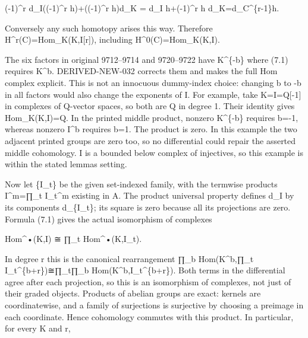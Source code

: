 \documentclass[11pt]{article}
\begin{document}
(-1)\allowbreak{}\textasciicircum{}r d\_\allowbreak{}I((-1)\allowbreak{}\textasciicircum{}r h)\allowbreak{}\allowbreak{}+((-1)\allowbreak{}\textasciicircum{}r h)\allowbreak{}d\_\allowbreak{}K \allowbreak{}= d\_\allowbreak{}I h\allowbreak{}+(-1)\allowbreak{}\textasciicircum{}r h d\_\allowbreak{}K\allowbreak{}=d\_\allowbreak{}C\textasciicircum{}\{r-1\}h.

Conversely any such homotopy arises this way. Therefore H\textasciicircum{}r(C)\allowbreak{}\allowbreak{}=Hom\_\allowbreak{}K(K,\allowbreak{}I[r]\allowbreak{})\allowbreak{},\allowbreak{} including H\textasciicircum{}0(C)\allowbreak{}\allowbreak{}=Hom\_\allowbreak{}K(K,\allowbreak{}I)\allowbreak{}.

The six factors in original 9712–\allowbreak{}9714 and 9720–\allowbreak{}9722 have K\^{}\{-b\} where (7.1)\allowbreak{} requires K\^{}b. DERIVED-NEW-032 corrects them and makes the full Hom complex explicit. This is not an innocuous dummy-index choice:\allowbreak{} changing b to -b in all factors would also change the exponents of I. For example,\allowbreak{} take K\allowbreak{}=I\allowbreak{}=Q[-1]\allowbreak{} in complexes of Q-vector spaces,\allowbreak{} so both are Q in degree 1. Their identity gives Hom\_\allowbreak{}K(K,\allowbreak{}I)\allowbreak{}\allowbreak{}=Q. In the printed middle product,\allowbreak{} nonzero K\^{}\{-b\} requires b\allowbreak{}=-1,\allowbreak{} whereas nonzero I\^{}b requires b\allowbreak{}=1. The product is zero. In this example the two adjacent printed groups are zero too,\allowbreak{} so no differential could repair the asserted middle cohomology. I is a bounded below complex of injectives,\allowbreak{} so this example is within the stated lemma\textquotesingle s setting.

Now let \{I\_\allowbreak{}t\} be the given set-indexed family,\allowbreak{} with the termwise products I\textasciicircum{}m\allowbreak{}=∏\_\allowbreak{}t I\_\allowbreak{}t\textasciicircum{}m existing in A. The product universal property defines d\_\allowbreak{}I by its components d\_\allowbreak{}\{I\_\allowbreak{}t\}; its square is zero because all its projections are zero. Formula (7.1)\allowbreak{} gives the actual isomorphism of complexes

Hom\textasciicircum{}•(K,\allowbreak{}I)\allowbreak{} ≅ ∏\_\allowbreak{}t Hom\textasciicircum{}•(K,\allowbreak{}I\_\allowbreak{}t)\allowbreak{}.

In degree r this is the canonical rearrangement ∏\_\allowbreak{}b Hom(K\textasciicircum{}b,\allowbreak{}∏\_\allowbreak{}t I\_\allowbreak{}t\textasciicircum{}\{b\allowbreak{}+r\})\allowbreak{}≅∏\_\allowbreak{}t∏\_\allowbreak{}b Hom(K\textasciicircum{}b,\allowbreak{}I\_\allowbreak{}t\textasciicircum{}\{b\allowbreak{}+r\})\allowbreak{}. Both terms in the differential agree after each projection,\allowbreak{} so this is an isomorphism of complexes,\allowbreak{} not just of their graded objects. Products of abelian groups are exact:\allowbreak{} kernels are coordinatewise,\allowbreak{} and a family of surjections is surjective by choosing a preimage in each coordinate. Hence cohomology commutes with this product. In particular,\allowbreak{} for every K and r,\allowbreak{}
\end{document}
